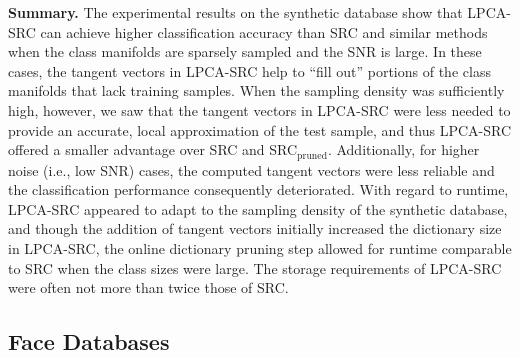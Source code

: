 \documentclass[review]{elsarticle}
\begin{document}
\textbf{Summary.} The experimental results on the synthetic database show that LPCA-SRC can achieve higher classification accuracy than SRC and similar methods when the class manifolds are sparsely sampled and the SNR is large. In these cases, the tangent vectors in LPCA-SRC help to ``fill out'' portions of the class manifolds that lack training samples. When the sampling density was sufficiently high, however, we saw that the tangent vectors in LPCA-SRC were less needed to provide an accurate, local approximation of the test sample, and thus LPCA-SRC offered a smaller advantage over SRC and SRC$_\mathrm{pruned}$. Additionally, for higher noise (i.e., low SNR) cases, the computed tangent vectors were less reliable and the classification performance consequently deteriorated. With regard to runtime, LPCA-SRC appeared to adapt to the sampling density of the synthetic database, and though the addition of tangent vectors initially increased the dictionary size in LPCA-SRC, the online dictionary pruning step allowed for runtime comparable to SRC when the class sizes were large. The storage requirements of LPCA-SRC were often not more than twice those of SRC.


\subsection{Face Databases} 
\end{document}
